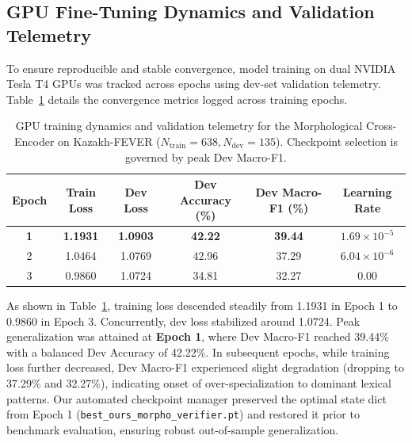 \subsection{GPU Fine-Tuning Dynamics and Validation Telemetry}
\label{sec:training_telemetry}
To ensure reproducible and stable convergence, model training on dual NVIDIA Tesla T4 GPUs was tracked across epochs using dev-set validation telemetry. Table~\ref{tab:training_telemetry} details the convergence metrics logged across training epochs.

\begin{table}[ht]
\centering
\small
\setlength{\tabcolsep}{5pt}
\caption{GPU training dynamics and validation telemetry for the Morphological Cross-Encoder on Kazakh-FEVER ($N_{\text{train}} = 638, N_{\text{dev}} = 135$). Checkpoint selection is governed by peak Dev Macro-F1.}
\label{tab:training_telemetry}
\begin{tabular}{cccccc}
\toprule
\textbf{Epoch} & \textbf{Train Loss} & \textbf{Dev Loss} & \textbf{Dev Accuracy (\%)} & \textbf{Dev Macro-F1 (\%)} & \textbf{Learning Rate} \\
\midrule
\textbf{1} & \textbf{1.1931} & \textbf{1.0903} & \textbf{42.22} & \textbf{39.44} & \textbf{$1.69 \times 10^{-5}$} \\
2 & 1.0464 & 1.0769 & 42.96 & 37.29 & $6.04 \times 10^{-6}$ \\
3 & 0.9860 & 1.0724 & 34.81 & 32.27 & $0.00$ \\
\bottomrule
\end{tabular}
\end{table}

As shown in Table~\ref{tab:training_telemetry}, training loss descended steadily from 1.1931 in Epoch 1 to 0.9860 in Epoch 3. Concurrently, dev loss stabilized around 1.0724. Peak generalization was attained at \textbf{Epoch 1}, where Dev Macro-F1 reached 39.44\% with a balanced Dev Accuracy of 42.22\%. In subsequent epochs, while training loss further decreased, Dev Macro-F1 experienced slight degradation (dropping to 37.29\% and 32.27\%), indicating onset of over-specialization to dominant lexical patterns. Our automated checkpoint manager preserved the optimal state dict from Epoch 1 (\texttt{best\_ours\_morpho\_verifier.pt}) and restored it prior to benchmark evaluation, ensuring robust out-of-sample generalization.
